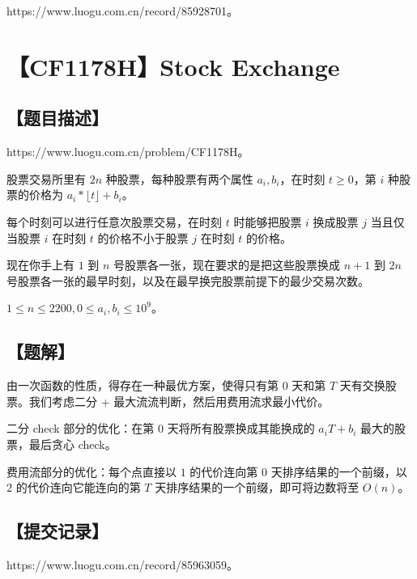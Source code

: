 \documentclass[UTF8,12pt,a4paper]{ctexart}
\begin{document}
	https://www.luogu.com.cn/record/85928701。
	
	
	\section*{【CF1178H】Stock Exchange}
	
	\subsection*{【题目描述】}
	
	https://www.luogu.com.cn/problem/CF1178H。
	
	股票交易所里有 $2n$ 种股票，每种股票有两个属性 $a_i,b_i$，在时刻 $t\ge 0$，第 $i$ 种股票的价格为 $a_i*\lfloor t\rfloor+b_i$。
	
	每个时刻可以进行任意次股票交易，在时刻 $t$ 时能够把股票 $i$ 换成股票 $j$ 当且仅当股票 $i$ 在时刻 $t$ 的价格不小于股票 $j$ 在时刻 $t$ 的价格。
	
	现在你手上有 $1$ 到 $n$ 号股票各一张，现在要求的是把这些股票换成 $n+1$ 到 $2n$ 号股票各一张的最早时刻，以及在最早换完股票前提下的最少交易次数。
	
	$1\le n\le 2200,0\le a_i,b_i\le 10^9$。
	
	\subsection*{【题解】}
	
	由一次函数的性质，得存在一种最优方案，使得只有第 $0$ 天和第 $T$ 天有交换股票。我们考虑二分 + 最大流流判断，然后用费用流求最小代价。
	
	二分 check 部分的优化：在第 $0$ 天将所有股票换成其能换成的 $a_iT+b_i$ 最大的股票，最后贪心 check。
	
	费用流部分的优化：每个点直接以 $1$ 的代价连向第 $0$ 天排序结果的一个前缀，以 $2$ 的代价连向它能连向的第 $T$ 天排序结果的一个前缀，即可将边数将至 $O(n)$。
	
	
	\subsection*{【提交记录】}
	
	https://www.luogu.com.cn/record/85963059。
	
\end{document}
